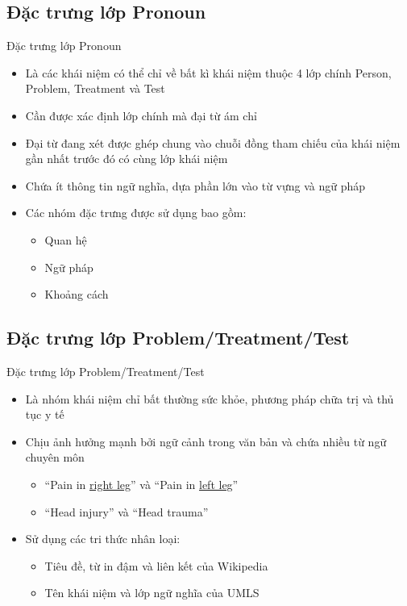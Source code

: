 \subsection{Đặc trưng lớp Pronoun}
\begin{frame}{Đặc trưng lớp Pronoun}
\putlogo
\begin{itemize}
	\item Là các khái niệm có thể chỉ về bất kì khái niệm thuộc 4 lớp chính Person, Problem, Treatment và Test
	\item Cần được {\color{red} xác định lớp chính} mà đại từ ám chỉ
	\item Đại từ đang xét được ghép chung vào chuỗi đồng tham chiếu của khái niệm gần nhất trước đó có cùng lớp khái niệm
	\item Chứa ít thông tin ngữ nghĩa, dựa phần lớn vào từ vựng và ngữ pháp
	\item Các nhóm đặc trưng được sử dụng bao gồm:
	\begin{itemize}
		\item Quan hệ
		\item Ngữ pháp
		\item Khoảng cách
	\end{itemize}
\end{itemize}
\end{frame}

\subsection{Đặc trưng lớp Problem/Treatment/Test}
\begin{frame}{Đặc trưng lớp Problem/Treatment/Test}
\putlogo
\begin{itemize}
	\item Là nhóm khái niệm chỉ bất thường sức khỏe, phương pháp chữa trị và thủ tục y tế
	\item Chịu ảnh hưởng mạnh bởi {\color{red} ngữ cảnh trong văn bản} và chứa nhiều {\color{red} từ ngữ chuyên môn}
	\begin{itemize}
		\item ``Pain in \underline{right leg}'' và ``Pain in \underline{left leg}''
		\item ``Head injury'' và ``Head trauma''
	\end{itemize}
	\item Sử dụng các tri thức nhân loại:
	\begin{itemize}
		\item Tiêu đề, từ in đậm và liên kết của {\color{red} Wikipedia}
		\item Tên khái niệm và lớp ngữ nghĩa của {\color{red} UMLS}
	\end{itemize}
\end{itemize}
\end{frame}

